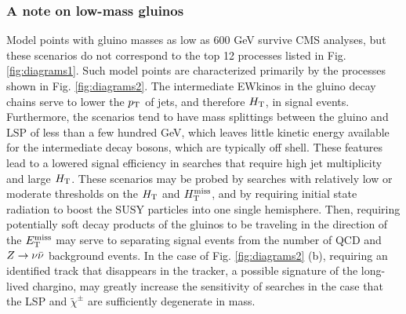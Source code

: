 \subsubsection{A note on low-mass gluinos}
Model points with gluino masses as low as 600 GeV survive CMS analyses, but these scenarios do not correspond to the top 12 processes listed in Fig. \ref{fig:diagrams1}. Such model points are characterized primarily by the processes shown in Fig. \ref{fig:diagrams2}. The intermediate EWkinos in the gluino decay chains serve to lower the $p_{\text{T}}$ of jets, and therefore $H_{\rm T}$, in signal events. Furthermore, the scenarios tend to have mass splittings between the gluino and LSP of less than a few hundred GeV, which leaves little kinetic energy available for the intermediate decay bosons, which are typically off shell. These features lead to a lowered signal efficiency in searches that require high jet multiplicity and large $H_{\rm T}$. These scenarios may be probed by searches with relatively low or moderate thresholds on the $H_{\rm T}$ and $H_{\text{T}}^{\rm miss}$, and by requiring initial state radiation to boost the SUSY particles into one single hemisphere. Then, requiring potentially soft decay products of the gluinos to be traveling in the direction of the $E_{\text{T}}^{\rm miss}$ may serve to separating signal events from the number of QCD and $Z\rightarrow \nu\bar{\nu}$ background events. In the case of Fig. \ref{fig:diagrams2} (b), requiring an identified track that disappears in the tracker,  a possible signature of the long-lived chargino, may greatly increase the sensitivity of searches in the case that the LSP and $\tilde{\chi}^{\pm}$ are sufficiently degenerate in mass.
